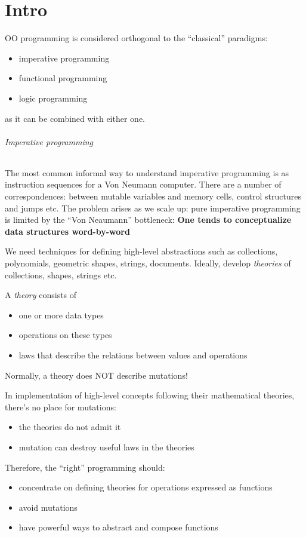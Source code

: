 \documentclass{scrartcl}
\begin{document}
\part{Intro}
\label{part:Intro}

OO programming is considered orthogonal to the ``classical'' paradigms:
\begin{itemize}
\item imperative programming
\item functional programming
\item logic programming
\end{itemize}
as it can be combined with either one.

\paragraph{Imperative programming}

The most common informal way to understand imperative programming is as
instruction sequences for a Von Neumann computer. There are a number of
correspondences: between mutable variables and memory cells, control structures
and jumps etc. The problem arises as we scale up: pure imperative programming is
limited by the ``Von Neaumann'' bottleneck: {\bf One tends to conceptualize data
  structures word-by-word}

We need techniques for defining high-level abstractions such as collections,
polynomials, geometric shapes, strings, documents. Ideally, develop {\it
  theories} of collections, shapes, strings etc.

A {\it theory} consists of
\begin{itemize}
\item one or more data types
\item operations on these types
\item laws that describe the relations between values and operations
\end{itemize}
Normally, a theory does NOT describe mutations!

In implementation of high-level concepts following their mathematical theories,
there's no place for mutations:
\begin{itemize}
\item the theories do not admit it
\item mutation can destroy useful laws in the theories
\end{itemize}
Therefore, the ``right'' programming should:
\begin{itemize}
\item concentrate on defining theories for operations expressed as functions
\item avoid mutations
\item have powerful ways to abstract and compose functions
\end{itemize}
\end{document}
